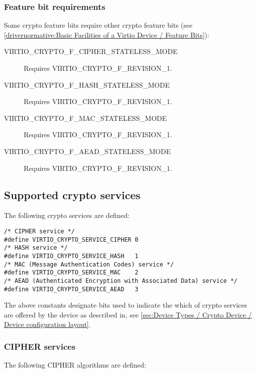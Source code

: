 \subsubsection{Feature bit requirements}\label{sec:Device Types / Crypto Device / Feature bit requirements}

Some crypto feature bits require other crypto feature bits
(see \ref{drivernormative:Basic Facilities of a Virtio Device / Feature Bits}):

\begin{description}
\item[VIRTIO_CRYPTO_F_CIPHER_STATELESS_MODE] Requires VIRTIO_CRYPTO_F_REVISION_1.
\item[VIRTIO_CRYPTO_F_HASH_STATELESS_MODE] Requires VIRTIO_CRYPTO_F_REVISION_1.
\item[VIRTIO_CRYPTO_F_MAC_STATELESS_MODE] Requires VIRTIO_CRYPTO_F_REVISION_1.
\item[VIRTIO_CRYPTO_F_AEAD_STATELESS_MODE] Requires VIRTIO_CRYPTO_F_REVISION_1.
\end{description}

\subsection{Supported crypto services}\label{sec:Device Types / Crypto Device / Supported crypto services}

The following crypto services are defined:

\begin{lstlisting}
/* CIPHER service */
#define VIRTIO_CRYPTO_SERVICE_CIPHER 0
/* HASH service */
#define VIRTIO_CRYPTO_SERVICE_HASH   1
/* MAC (Message Authentication Codes) service */
#define VIRTIO_CRYPTO_SERVICE_MAC    2
/* AEAD (Authenticated Encryption with Associated Data) service */
#define VIRTIO_CRYPTO_SERVICE_AEAD   3
\end{lstlisting}

The above constants designate bits used to indicate the which of crypto services are
offered by the device as described in, see \ref{sec:Device Types / Crypto Device / Device configuration layout}.

\subsubsection{CIPHER services}\label{sec:Device Types / Crypto Device / Supported crypto services / CIPHER services}

The following CIPHER algorithms are defined:

